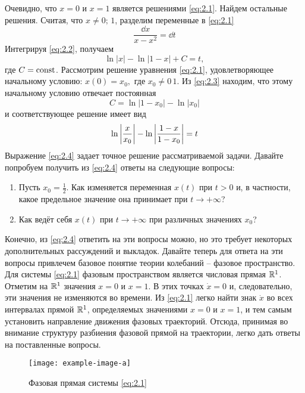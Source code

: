 Очевидно, что $x=0$ и $x=1$ является решениями \eqref{eq:2.1}. Найдем остальные решения. Считая, что $x\neq 0;\,1$, разделим переменные в \eqref{eq:2.1}
\begin{equation}
	\label{eq:2.2}
	\frac{\dd{x}}{x-x^2}= \dd{t}
\end{equation}
Интегрируя \eqref{eq:2.2}, получаем 
\begin{equation}
	\label{eq:2.3}
	\ln|x| - \ln|1-x|+C=t,		
\end{equation}
где $C=\textrm{const}$. Рассмотрим решение уравнения \eqref{eq:2.1}, удовлетворяющее начальному условию: $x(0)=x_0,$ где $x_0\neq 0\,1$. Из \eqref{eq:2.3} находим, что этому начальному условию отвечает постоянная
\begin{equation}
	\label{eq:}
	C=\ln|1-x_0| - \ln|x_0|
\end{equation}
и соответствующее решение имеет вид
\begin{equation}
	\label{eq:2.4}
	\ln\abs{\frac{x}{x_0}} - \ln\abs{\frac{1-x}{1-x_0}}=t
\end{equation}
Выражение \eqref{eq:2.4} задает точное решение рассматриваемой задачи. Давайте попробуем получить из \eqref{eq:2.4} ответы на следующие вопросы:
\begin{enumerate}
	\item Пусть $x_0=\frac12$. Как изменяется переменная $x(t)$ при $t>0$ и, в частности, какое предельное значение она принимает при $t \rightarrow +\infty$?
	\item Как ведёт себя $x(t)$ при $t \rightarrow + \infty$ при различных значениях $x_0$?
\end{enumerate}

Конечно, из \eqref{eq:2.4} ответить на эти вопросы можно, но это требует некоторых дополнительных рассуждений и выкладок. Давайте теперь для ответа на эти вопросы привлечем базовое понятие теории колебаний -- фазовое пространство. Для системы \eqref{eq:2.1} фазовым пространством является числовая прямая $\mathbb{R}^1$. Отметим на $\mathbb{R}^1$ значения $x=0$ и $x=1$. В этих точках $\dot x=0$ и, следовательно, эти значения не изменяются во времени. Из \eqref{eq:2.1} легко найти знак $\dot x$ во всех интервалах прямой $\mathbb{R}^1$, определяемых значениями $x=0$ и $x=1$, и тем самым установить направление движения фазовых траекторий. Отсюда, принимая во внимание структуру разбиения фазовой прямой на траектории, легко дать ответы на поставленные вопросы.

\begin{figure}[h!]
	\centering
	\texttt{[image: example-image-a]}
	\caption{Фазовая прямая системы \eqref{eq:2.1}}
	\label{fig:2.2}
\end{figure}





